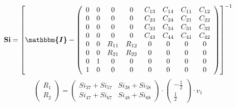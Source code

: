 \documentclass[10pt]{article} \usepackage{amsmath} \usepackage{bbold}
\begin{document}
\[ \mathbf{Si} = \left[ \boldsymbol{\mathbbm{I}}  -
\left(\begin{array}{cccccccc} 0 & 0 & 0 & 0 & C_{13} & C_{14} & C_{11}
& C_{12} \\ 0 & 0 & 0 & 0 & C_{23} & C_{24} & C_{21} & C_{22} \\ 0 & 0
& 0 & 0 & C_{33} & C_{34} & C_{31} & C_{32} \\ 0 & 0 & 0 & 0 & C_{43}
& C_{44} & C_{41} & C_{42} \\ 0 & 0 & R_{11} & R_{12} & 0 & 0 & 0 & 0
\\ 0 & 0 & R_{21} & R_{22} & 0 & 0 & 0 & 0 \\ 0 & 1 & 0 & 0 & 0 & 0 &
0 & 0 \\ 1 & 0 & 0 & 0 & 0 & 0 & 0 & 0 \end{array}\right) \right]^{-1}
\]
\[ \left(\begin{array}{c} R_{1} \\ R_{2}
\end{array}\right)=\left(\begin{array}{cc} Si_{37} + Si_{57} & Si_{38}
+ Si_{58} \\ Si_{47} + Si_{67} & Si_{48} + Si_{68} \end{array}\right)
\cdot \left(\begin{array}{c} -\frac{1}{2} \\ \frac{1}{2}
\end{array}\right)\cdot v_{1} \]
\end{document}
